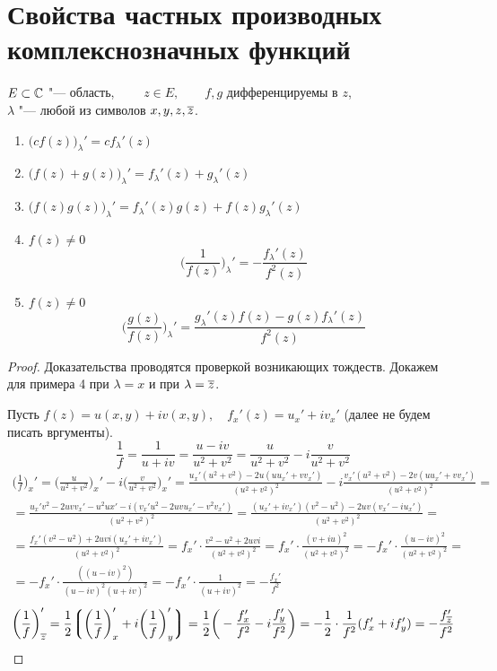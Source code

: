 \section{Свойства частных производных комплекснозначных функций}

\begin{properties}
	$ E \subset \mathbb{C} $ "--- область, $ \qquad z \in E, \qquad f, g $ дифференцируемы в $ z $, \\
	$ \lambda $ "--- любой из символов $ x, y, z, \overline z $.
	\begin{enumerate}
		\item $ \bigg( cf(z) \bigg)_\lambda' = cf_\lambda'(z) $
		\item $ \bigg( f(z) + g(z) \bigg)_\lambda' = f_\lambda'(z) + g_\lambda'(z) $
		\item $ \bigg( f(z)g(z) \bigg)_\lambda' = f_\lambda'(z)g(z) + f(z)g_\lambda'(z) $
		\item $ f(z) \ne 0 $
		$$ \bigg( \frac1{f(z)} \bigg)_\lambda' = -\frac{f_\lambda'(z)}{f^2(z)} $$
		\item $ f(z) \ne 0 $
		$$ \bigg( \frac{g(z)}{f(z)} \bigg)_\lambda' = \frac{g_\lambda'(z)f(z) - g(z)f_\lambda'(z)}{f^2(z)} $$
	\end{enumerate}
\end{properties}

\begin{proof}
	Доказательства проводятся проверкой возникающих тождеств. Докажем для примера 4 при $ \lambda = x $ и при $ \lambda = \overline z $.

	Пусть $ f(z) = u(x, y) + iv(x, y), \quad f_x'(z) = u_x' + iv_x' $ (далее не будем писать вргументы).
	$$ \frac1f = \frac1{u + iv} = \frac{u - iv}{u^2 + v^2} = \frac u{u^2 + v^2} - i \frac v{u^2 + v^2} $$
	\begin{multline*}
		\bigg( \frac1f \bigg)_x' = \bigg( \frac u{u^2 + v^2} \bigg)_x' - i \bigg( \frac v{u^2 + v^2} \bigg)_x' = \frac{u_x'(u^2 + v^2) - 2u(uu_x' + vv_x')}{(u^2 + v^2)^2} - i \frac{v_x'(u^2 + v^2) - 2v(uu_x' + vv_x')}{(u^2 + v^2)^2} = \\
		= \frac{u_x'v^2 - 2uvv_x' - u^2ux' - i(v_x'u^2 - 2uvu_x' - v^2v_x')}{(u^2 + v^2)^2} = \frac{(u_x' + iv_x')(v^2 - u^2) - 2uv(v_x' - iu_x')}{(u^2 + v^2)^2} = \\
		= \frac{f_x'(v^2 - u^2) + 2uvi(u_x' + iv_x')}{(u^2 + v^2)^2} = f_x' \cdot \frac{v^2 - u^2 + 2uvi}{(u^2 + v^2)^2} = f_x' \cdot \frac{(v + iu)^2}{(u^2 + v^2)^2} = -f_x' \cdot \frac{(u - iv)^2}{(u^2 + v^2)^2} = \\
		= -f_x' \cdot \frac{((u - iv)^2)}{(u - iv)^2(u + iv)^2} = -f_x' \cdot \frac1{(u + iv)^2} = -\frac{f_x'}{f^2}
	\end{multline*}
	$$ \bigg( \frac1f \bigg)_{\overline z}' = \frac12 \bigg\lgroup \bigg( \frac1f \bigg)_x' + i \bigg( \frac1f \bigg)_y' \bigg\rgroup = \frac12 \bigg( -\frac{f_x'}{f^2} - i \frac{f_y'}{f^2} \bigg) = -\frac12 \cdot \frac1{f^2} (f_x' + if_y') = -\frac{f_{\overline z}'}{f^2} $$
\end{proof}

